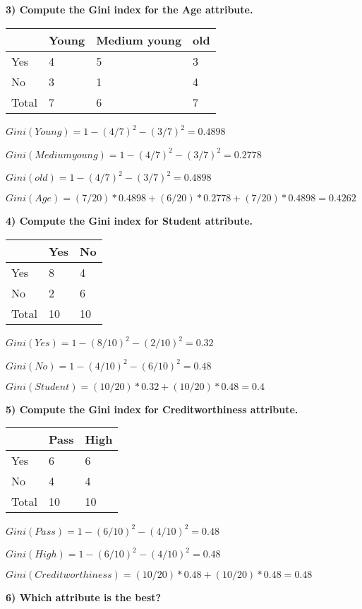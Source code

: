 		{\bf 3) Compute the Gini index for the Age attribute.}

		\begin{table}[H]
			\begin{tabular}{ l | l | l | l  }
				 & Young & Medium young & old  \\ \hline
				Yes & 4 & 5 & 3 \\ \hline
				No & 3 & 1 & 4 \\ \hline
				Total & 7 & 6 & 7 \\
			\end{tabular}
		\end{table}

		$Gini(Young) = 1 - (4/7)^{2} - (3/7)^{2} = 0.4898$

		$Gini(Medium young) = 1 - (4/7)^{2} - (3/7)^{2} = 0.2778$

		$Gini(old) = 1 - (4/7)^{2} - (3/7)^{2} = 0.4898$
		
		$Gini(Age) = (7/20)*0.4898 + (6/20)*0.2778 + (7/20)*0.4898 = 0.4262$		

		{\bf 4) Compute the Gini index for Student attribute.}

		\begin{table}[H]
			\begin{tabular}{ l | l | l }
				 & Yes & No   \\ \hline
				Yes & 8 & 4 \\ \hline
				No & 2 & 6 \\ \hline
				Total & 10 & 10 \\
			\end{tabular}
		\end{table}

		$Gini(Yes) = 1 - (8/10)^{2} - (2/10)^{2} = 0.32$

		$Gini(No) = 1 - (4/10)^{2} - (6/10)^{2} = 0.48$
		
		$Gini(Student) = (10/20)*0.32 + (10/20)*0.48 = 0.4$

		{\bf 5) Compute the Gini index for Creditworthiness attribute.}

		\begin{table}[H]
			\begin{tabular}{ l | l | l }
				 & Pass & High   \\ \hline
				Yes & 6 & 6 \\ \hline
				No & 4 & 4 \\ \hline
				Total & 10 & 10 \\
			\end{tabular}
		\end{table}

		$Gini(Pass) = 1 - (6/10)^{2} - (4/10)^{2} = 0.48$

		$Gini(High) = 1 - (6/10)^{2} - (4/10)^{2} = 0.48$
		
		$Gini(Creditworthiness) = (10/20)*0.48 + (10/20)*0.48 = 0.48$

		{\bf 6) Which attribute is the best?}